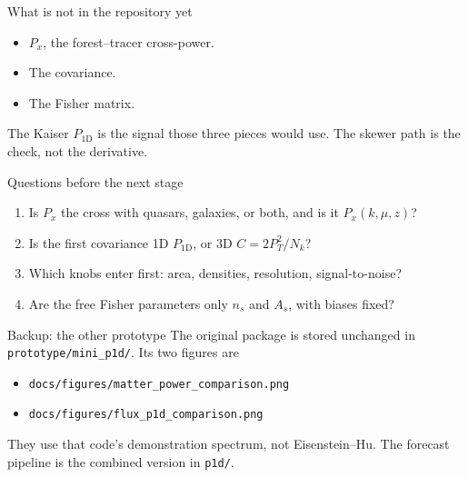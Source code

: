 \documentclass[aspectratio=169,11pt]{beamer}
\begin{document}
\begin{frame}{What is not in the repository yet}
  \begin{itemize}
    \item \(P_x\), the forest--tracer cross-power.
    \item The covariance.
    \item The Fisher matrix.
  \end{itemize}
  \vspace{0.6em}
  The Kaiser \(P_{1\mathrm{D}}\) is the signal those three pieces would use.
  The skewer path is the check, not the derivative.
\end{frame}

\begin{frame}{Questions before the next stage}
  \begin{enumerate}
    \item Is \(P_x\) the cross with quasars, galaxies, or both, and is it \(P_x(k,\mu,z)\)?
    \item Is the first covariance 1D \(P_{1\mathrm{D}}\), or 3D \(C=2P_T^2/N_k\)?
    \item Which knobs enter first: area, densities, resolution, signal-to-noise?
    \item Are the free Fisher parameters only \(n_s\) and \(A_s\), with biases fixed?
  \end{enumerate}
\end{frame}

\appendix
\begin{frame}{Backup: the other prototype}
  The original package is stored unchanged in \texttt{prototype/mini\_p1d/}.
  \vspace{0.6em}
  Its two figures are
  \begin{itemize}
    \item \texttt{docs/figures/matter\_power\_comparison.png}
    \item \texttt{docs/figures/flux\_p1d\_comparison.png}
  \end{itemize}
  They use that code's demonstration spectrum, not Eisenstein--Hu.
  The forecast pipeline is the combined version in \texttt{p1d/}.
\end{frame}
\end{document}

